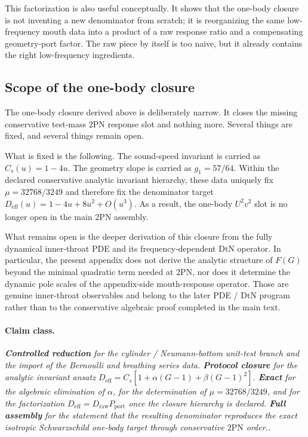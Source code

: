 \documentclass[11pt]{article}
\newcommand{\TwoPN}{\mathrm{2PN}}
\newcommand{\DtN}{\mathrm{DtN}}
\newcommand{\Exact}{\textbf{Exact}}
\newcommand{\Controlled}{\textbf{Controlled reduction}}
\newcommand{\Protocol}{\textbf{Protocol closure}}
\newcommand{\FullMatch}{\textbf{Full assembly}}
\newcommand{\claimclass}[1]{\paragraph{Claim class.}\emph{#1.}}
\begin{document}
This factorization is also useful conceptually.  It shows that the one-body closure is
not inventing a new denominator from scratch; it is reorganizing the same low-frequency
mouth data into a product of a raw response ratio and a compensating geometry-port
factor.  The raw piece by itself is too naive, but it already contains the right
low-frequency ingredients.

\subsection{Scope of the one-body closure}
\label{app:one-body-dtn-scope}

The one-body closure derived above is deliberately narrow.
It closes the missing conservative test-mass \(\TwoPN\) response slot and nothing more.
Several things are fixed, and several things remain open.

What is fixed is the following.
The sound-speed invariant is carried as \(C_s(u)=1-4u\).
The geometry slope is carried as \(g_1=57/64\).
Within the declared conservative analytic invariant hierarchy, these data uniquely fix
\(\mu=32768/3249\) and therefore fix the denominator target
\(D_{\mathrm{eff}}(u)=1-4u+8u^2+O(u^3)\).
As a result, the one-body \(U^2v^2\) slot is no longer open in the main \(\TwoPN\)
assembly.

What remains open is the deeper derivation of this closure from the fully dynamical
inner-throat PDE and its frequency-dependent \(\DtN\) operator.
In particular, the present appendix does not derive the analytic structure of
\(F(G)\) beyond the minimal quadratic term needed at \(\TwoPN\), nor does it determine
the dynamic pole scales of the appendix-side mouth-response operator.  Those are genuine
inner-throat observables and belong to the later PDE / \(\DtN\) program rather than to
the conservative algebraic proof completed in the main text.

\claimclass{\Controlled{} for the cylinder / Neumann-bottom unit-test branch and the
import of the Bernoulli and breathing series data.
\Protocol{} for the analytic invariant ansatz
\(D_{\mathrm{eff}}=C_s[1+\alpha(G-1)+\beta(G-1)^2]\).
\Exact{} for the algebraic elimination of \(\alpha\), for the determination of
\(\mu=32768/3249\), and for the factorization
\(D_{\mathrm{eff}}=D_{\mathrm{raw}}P_{\mathrm{port}}\) once the closure hierarchy is declared.
\FullMatch{} for the statement that the resulting denominator reproduces the exact
isotropic Schwarzschild one-body target through conservative \(\TwoPN\) order.}
\end{document}
